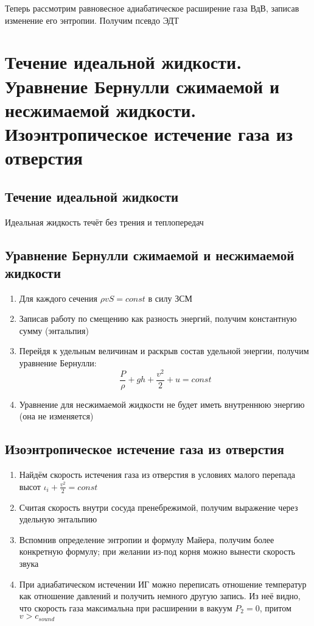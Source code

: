 \documentclass[a4paper, 14pt]{article}
\begin{document}
    Теперь рассмотрим равновесное адиабатическое расширение газа ВдВ, записав изменение его энтропии.
    Получим псевдо ЭДТ

    \section{Течение идеальной жидкости.
    Уравнение Бернулли сжимаемой и несжимаемой жидкости.
    Изоэнтропическое истечение газа из отверстия}

    \subsection{Течение идеальной жидкости}

    Идеальная жидкость течёт без трения и теплопередач

    \subsection{Уравнение Бернулли сжимаемой и несжимаемой жидкости}

    \begin{enumerate}
        \item Для каждого сечения $\rho vS = const$ в силу ЗСМ
        \item Записав работу по смещению как разность энергий, получим константную сумму (энтальпия)
        \item Перейдя к удельным величинам и раскрыв состав удельной энергии, получим уравнение Бернулли:
        \[ \frac{P}{\rho} + gh + \frac{v^2}{2} + u = const \]
        \item Уравнение для несжимаемой жидкости не будет иметь внутреннюю энергию (она не изменяется)
    \end{enumerate}

    \subsection{Изоэнтропическое истечение газа из отверстия}

    \begin{enumerate}
        \item Найдём скорость истечения газа из отверстия в условиях малого перепада высот $\iota_i + \frac{v^2}{2} = const$
        \item Считая скорость внутри сосуда пренебрежимой, получим выражение через удельную энтальпию
        \item Вспомнив определение энтропии и формулу Майера, получим более конкретную формулу; при желании из-под
        корня можно вынести скорость звука
        \item При адиабатическом истечении ИГ можно переписать отношение температур как отношение давлений и получить
        немного другую запись.
        Из неё видно, что скорость газа максимальна при расширении в вакуум $P_2 = 0$, притом $v > c_{sound}$
    \end{enumerate}
\end{document}

